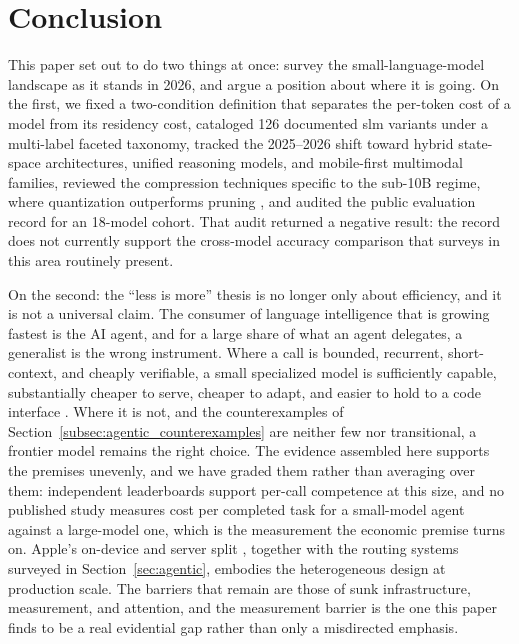 \section{Conclusion}
\label{section:conclusion}

This paper set out to do two things at once: survey the small-language-model
landscape as it stands in 2026, and argue a position about where it is going. On
the first, we fixed a two-condition definition that separates the per-token cost
of a model from its residency cost, cataloged 126 documented \gls{slm} variants
under a multi-label faceted taxonomy, tracked the 2025--2026 shift toward hybrid
state-space architectures, unified reasoning models, and mobile-first multimodal
families, reviewed the compression techniques specific to the sub-10B regime,
where quantization outperforms pruning \citep{kurz2025pruning_vs_quant}, and
audited the public evaluation record for an 18-model cohort. That audit returned
a negative result: the record does not currently support the cross-model accuracy
comparison that surveys in this area routinely present.

On the second: the ``less is more'' thesis is no longer only about efficiency,
and it is not a universal claim. The consumer of language intelligence that is
growing fastest is the AI agent, and for a large share of what an agent
delegates, a generalist is the wrong instrument. Where a call is bounded,
recurrent, short-context, and cheaply verifiable, a small specialized model is
sufficiently capable, substantially cheaper to serve, cheaper to adapt, and
easier to hold to a code interface \citep{belcak2025slm_agentic}. Where it is
not, and the counterexamples of
Section~\ref{subsec:agentic_counterexamples} are neither few nor transitional,
a frontier model remains the right choice. The evidence assembled here supports
the premises unevenly, and we have graded them rather than averaging over them:
independent leaderboards support per-call competence at this size, and no
published study measures cost per completed task for a small-model agent against
a large-model one, which is the measurement the economic premise turns on. Apple's
on-device and server split \citep{gunter2025afm}, together with the routing
systems surveyed in Section~\ref{sec:agentic}, embodies the heterogeneous design
at production scale.
The barriers that remain are those of sunk infrastructure, measurement, and
attention, and the measurement barrier is the one this paper finds to be a real
evidential gap rather than only a misdirected emphasis.

